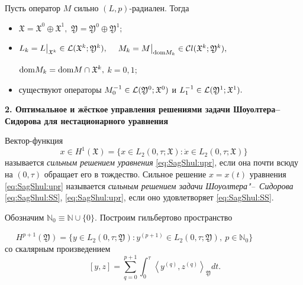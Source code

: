 \smallskip

\begin{theorem}[2]Пусть оператор $M$ сильно
$(L,p)$-радиален$.$ Тогда
\begin{itemize}

\item[{\rm (i)}] ${\mathfrak X}={\mathfrak X}^0 \oplus{\mathfrak X}^1,$
${\mathfrak Y}={\mathfrak Y}^0\oplus {\mathfrak Y}^1;$

\item[{\rm (ii)}] $L_k=L\big|_{{\mathfrak X}^k}\in{\cal L}({\mathfrak X}^k;{\mathfrak Y}^k),$
$\quad M_k=M\big|_{{\rm dom}M_k}\in{\cal C}l({\mathfrak X}^k;{\mathfrak Y}^k),$

${\rm dom}M_k={\rm dom}M\cap{\mathfrak X}^k,$ $k=0, 1;$

\item[{\rm (iii)}] существуют  операторы $M^{-1}_0\in{\cal L}({\mathfrak Y}^0;{\mathfrak X}^0)$ и
$L^{-1}_1\in{\cal L}({\mathfrak Y}^1;{\mathfrak X}^1).$

\end{itemize}

\end{theorem}

\smallskip

\textbf{2. Оптимальное и жёсткое управления решениями задачи Шоуолтера--Сидорова для нестационарного уравнения}

\begin{definition}[4]{\rm
Вектор-функция 
$$x\in H^1({\mathfrak X})=\{x\in L_2(0,\tau;{\mathfrak X}): \dot x\in L_2(0,\tau;{\mathfrak X})\}$$ называется {\it сильным решением уравнения} \eqref{eq:SagShul:upr}, если она почти всюду на $(0,\tau)$ обращает его в тождество. Сильное решение $x=x(t)$ уравнения \eqref{eq:SagShul:upr} называется {\it сильным решением задачи Шоуолтера"--~Сидорова} \eqref{eq:SagShul:SS}, \eqref{eq:SagShul:upr}, если оно удовлетворяет \eqref{eq:SagShul:SS}.
}\end{definition}

\smallskip

Обозначим ${\mathbb N}_0\equiv{\mathbb N}\cup\{0\}$.
Построим гильбертово пространство

\vspace{3mm}
$\phantom{atr}
H^{p+1}({\mathfrak Y})=\{y\in L_2(0,\tau;{\mathfrak Y}): y^{(p+1)}\in L_2(0,\tau;{\mathfrak Y}),\ p\in{\mathbb N}_0\}$ \\ со скалярным произведением
$$
\ [y,z]=
{\displaystyle\sum_{q=0}^{p+1}\int _0^\tau\left\langle y^{(q)},z^{(q)}\right\rangle_{\mathfrak Y}dt}.
$$


